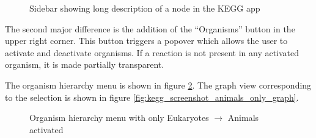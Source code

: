 \begin{figure}[hbt]
    \caption{\label{fig:kegg_screenshot_selection_no_info} Sidebar showing
    long description of a node in the KEGG app}
\end{figure}

The second major difference is the addition of the ``Organisms'' button in the
upper right corner. This button triggers a popover which allows the user to
activate and deactivate organisms. If a reaction is not present in any activated
organism, it is made partially transparent.

The organism hierarchy menu is shown in figure
\ref{fig:kegg_screenshot_animals_only_list}. The graph view corresponding to the
selection is shown in figure \ref{fig:kegg_screenshot_animals_only_graph}.

\begin{figure}[hbt]
    \caption{\label{fig:kegg_screenshot_animals_only_list} Organism hierarchy
    menu with only Eukaryotes $\rightarrow$ Animals activated}
\end{figure}

